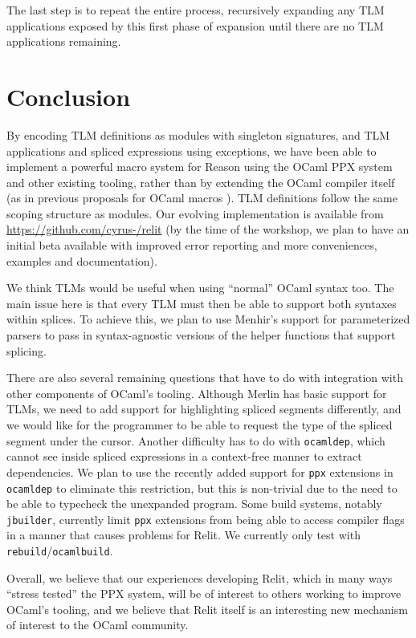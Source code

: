 \documentclass[acmsmall]{acmart}
\newcommand{\li}[1]{\lstinline[basicstyle=\ttfamily\fontsize{9pt}{1em}\selectfont]{#1}}
\theoremstyle{slplain}
\numberwithin{thm}{section}
\begin{document}
The last step is to repeat the entire process, recursively expanding any TLM applications exposed by this first phase of expansion until there are no TLM applications remaining.

\section{Conclusion}
By encoding TLM definitions as modules with singleton signatures, and TLM applications and spliced expressions using exceptions, we have been able to implement a powerful macro system for Reason using the OCaml PPX system and other existing tooling, rather than by extending the OCaml compiler itself (as in previous proposals for OCaml macros \cite{modular-macros}). TLM definitions follow the same scoping structure as modules. Our evolving implementation is available from \url{https://github.com/cyrus-/relit} (by the time of the workshop, we plan to have an initial beta available with improved error reporting and more conveniences, examples and documentation). 


We think TLMs would be useful when using ``normal'' OCaml syntax too. The main issue here is that every TLM must then be able to support both syntaxes within splices. To achieve this, we plan to use Menhir's support for parameterized parsers to pass in syntax-agnostic versions of the helper functions that support  splicing.

There are also several remaining questions that have to do with integration with other components of OCaml's tooling. Although Merlin has basic support for TLMs, we need to add support for highlighting spliced segments differently, and we would like for the programmer to be able to request the type of the spliced segment under the cursor. Another difficulty has to do with \li{ocamldep}, which cannot see inside spliced expressions in a context-free manner to extract dependencies. We plan to use the recently added support for \li{ppx} extensions in \li{ocamldep} to eliminate this restriction, but this is non-trivial due to the need to be able to typecheck the unexpanded program. Some build systems, notably \li{jbuilder}, currently limit \li{ppx} extensions from being able to access compiler flags in a manner that causes problems for Relit. We currently only test with \li{rebuild}/\li{ocamlbuild}.

Overall, we believe that our experiences developing Relit, which in many ways ``stress tested'' the PPX system, will be of interest to others working to improve OCaml's tooling, and we believe that Relit itself is an interesting new mechanism of interest to the OCaml community. 




% 
\end{document}
